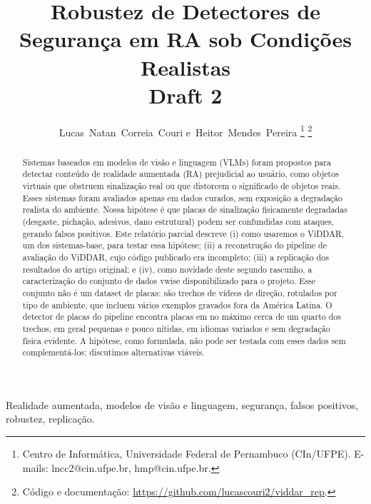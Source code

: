 \documentclass[journal,onecolumn]{IEEEtran}
\begin{document}
\title{Robustez de Detectores de Segurança em RA sob Condições Realistas\\
\large Draft 2}

\author{Lucas~Natan~Correia~Couri
        e~Heitor~Mendes~Pereira%
\thanks{Centro de Informática, Universidade Federal de Pernambuco (CIn/UFPE).
E-mails: lncc2@cin.ufpe.br, hmp@cin.ufpe.br.}%
\thanks{Código e documentação: \url{https://github.com/lucascouri2/viddar_rep}.}}


\maketitle

\begin{abstract}
Sistemas baseados em modelos de visão e linguagem (VLMs) foram propostos para detectar conteúdo de
realidade aumentada (RA) prejudicial ao usuário, como objetos virtuais que obstruem sinalização real
ou que distorcem o significado de objetos reais. Esses sistemas foram avaliados apenas em dados
curados, sem exposição a degradação realista do ambiente. Nossa hipótese é que placas de sinalização
fisicamente degradadas (desgaste, pichação, adesivos, dano estrutural) podem ser confundidas com
ataques, gerando falsos positivos. Este relatório parcial descreve (i) como usaremos o ViDDAR, um dos
sistemas-base, para testar essa hipótese; (ii) a reconstrução do pipeline de avaliação do ViDDAR, cujo
código publicado era incompleto; (iii) a replicação dos
resultados do artigo original; e (iv), como novidade deste segundo rascunho, a caracterização do conjunto de
dados vwise disponibilizado para o projeto. Esse conjunto não é um dataset de placas: são trechos de
vídeos de direção, rotulados por tipo de ambiente, que incluem vários exemplos gravados
fora da América Latina. O detector de placas do pipeline encontra placas em no máximo cerca de um
quarto dos trechos, em geral pequenas e pouco nítidas, em idiomas variados e sem degradação física
evidente. A hipótese, como formulada, não pode ser testada com esses dados sem complementá-los;
discutimos alternativas viáveis.
\end{abstract}

\begin{IEEEkeywords}
Realidade aumentada, modelos de visão e linguagem, segurança, falsos positivos, robustez, replicação.
\end{IEEEkeywords}
\end{document}
